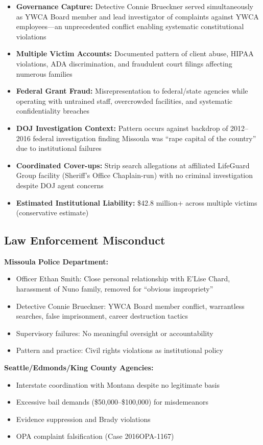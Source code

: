 \documentclass[12pt,oneside]{article}
\begin{document}
\begin{itemize}
\item \textbf{Governance Capture:} Detective Connie Brueckner served simultaneously as YWCA Board member and lead investigator of complaints against YWCA employees---an unprecedented conflict enabling systematic constitutional violations
\item \textbf{Multiple Victim Accounts:} Documented pattern of client abuse, HIPAA violations, ADA discrimination, and fraudulent court filings affecting numerous families
\item \textbf{Federal Grant Fraud:} Misrepresentation to federal/state agencies while operating with untrained staff, overcrowded facilities, and systematic confidentiality breaches
\item \textbf{DOJ Investigation Context:} Pattern occurs against backdrop of 2012--2016 federal investigation finding Missoula was ``rape capital of the country'' due to institutional failures
\item \textbf{Coordinated Cover-ups:} Strip search allegations at affiliated LifeGuard Group facility (Sheriff's Office Chaplain-run) with no criminal investigation despite DOJ agent concerns
\item \textbf{Estimated Institutional Liability:} \$42.8 million+ across multiple victims (conservative estimate)
\end{itemize}

\subsection*{Law Enforcement Misconduct}

\textbf{Missoula Police Department:}
\begin{itemize}
\item Officer Ethan Smith: Close personal relationship with E'Lise Chard, harassment of Nuno family, removed for ``obvious impropriety''
\item Detective Connie Brueckner: YWCA Board member conflict, warrantless searches, false imprisonment, career destruction tactics
\item Supervisory failures: No meaningful oversight or accountability
\item Pattern and practice: Civil rights violations as institutional policy
\end{itemize}

\textbf{Seattle/Edmonds/King County Agencies:}
\begin{itemize}
\item Interstate coordination with Montana despite no legitimate basis
\item Excessive bail demands (\$50,000--\$100,000) for misdemeanors
\item Evidence suppression and Brady violations
\item OPA complaint falsification (Case 2016OPA-1167)
\end{itemize}
\end{document}
